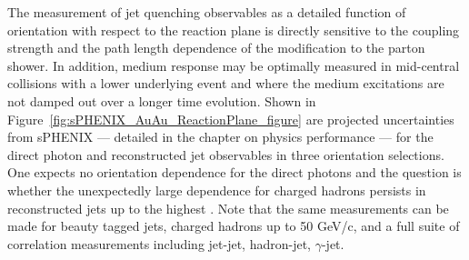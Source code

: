
The measurement of jet quenching observables as a detailed function of
orientation with respect to the reaction plane is directly sensitive
to the coupling strength and the path length dependence of the
modification to the parton shower.  In addition, medium response may
be optimally measured in mid-central collisions with a lower
underlying event and where the medium excitations are not damped out
over a longer time evolution.  Shown in
Figure~\ref{fig:sPHENIX_AuAu_ReactionPlane_figure} are projected
uncertainties from sPHENIX --- detailed in the chapter on physics
performance --- for the direct photon and reconstructed jet observables
in three orientation selections.  One expects no orientation
dependence for the direct photons and the question is whether the
unexpectedly large dependence for charged hadrons persists in
reconstructed jets up to the highest \pt.  Note that the same
measurements can be made for beauty tagged jets, charged hadrons up to
50 GeV/c, and a full suite of correlation measurements including
jet-jet, hadron-jet, $\gamma$-jet.

